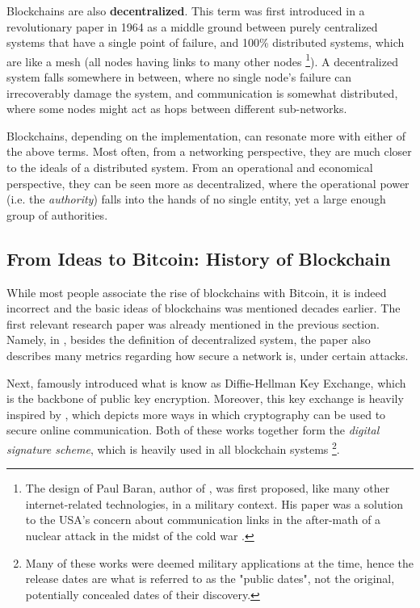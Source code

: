 Blockchains are also \textbf{decentralized}. This term was first introduced in a revolutionary paper
in 1964 as a middle ground between purely centralized systems that have a single point of failure,
and 100\% distributed systems, which are like a mesh (all nodes having links to many other nodes
\cite{baranDistributedCommunicationsNetworks1964} \footnote{The design of Paul Baran, author of
\cite{baranDistributedCommunicationsNetworks1964}, was first proposed, like many other
internet-related technologies, in a military context. His paper was a solution to the USA's concern
about communication links in the after-math of a nuclear attack in the midst of the cold war
\cite{monicaPaulBaranOrigins}.}). A decentralized system falls somewhere in between, where no single
node's failure can irrecoverably damage the system, and communication is somewhat
distributed, where some nodes might act as hops between different sub-networks.

Blockchains, depending on the implementation, can resonate more with either of the above terms. Most
often, from a networking perspective, they are much closer to the ideals of a distributed system.
From an operational and economical perspective, they can be seen more as decentralized, where the
operational power (i.e. the \textit{authority}) falls into the hands of no single entity, yet a
large enough group of authorities.


\subsection{From Ideas to Bitcoin: History of Blockchain} \label{chap_bg_:subsec:hisotry}

While most people associate the rise of blockchains with Bitcoin, it is indeed incorrect and the
basic ideas of blockchains was mentioned decades earlier. The first relevant research paper was
already mentioned in the previous section. Namely, in
\cite{baranDistributedCommunicationsNetworks1964}, besides the definition of decentralized system,
the paper also describes many  metrics regarding how secure a network is, under certain
attacks.

Next, \cite{diffieNewDirectionsCryptography1976} famously introduced what is know as Diffie-Hellman
Key Exchange, which is the backbone of public key encryption. Moreover, this key exchange is heavily
inspired by \cite{merkleSecureCommunicationsInsecure1978}, which depicts more ways in which
cryptography can be used to secure online communication. Both of these works together form the
\textit{digital signature scheme}, which is heavily used in all blockchain systems \footnote{Many of
these works were deemed military applications at the time, hence the release dates are what is
referred to as the "public dates", not the original, potentially concealed dates of their
discovery.}.

